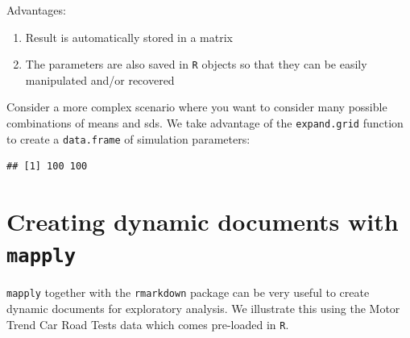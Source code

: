 \documentclass[]{book}
\makeatletter
\newenvironment{Shaded}{\begin{snugshade}}{\end{snugshade}}
\newcommand{\KeywordTok}[1]{\textcolor[rgb]{0.13,0.29,0.53}{\textbf{#1}}}
\newcommand{\DataTypeTok}[1]{\textcolor[rgb]{0.13,0.29,0.53}{#1}}
\newcommand{\DecValTok}[1]{\textcolor[rgb]{0.00,0.00,0.81}{#1}}
\newcommand{\StringTok}[1]{\textcolor[rgb]{0.31,0.60,0.02}{#1}}
\newcommand{\OperatorTok}[1]{\textcolor[rgb]{0.81,0.36,0.00}{\textbf{#1}}}
\newcommand{\NormalTok}[1]{#1}
\providecommand{\tightlist}{%
  \setlength{\itemsep}{0pt}\setlength{\parskip}{0pt}}
\providecommand{\tightlist}{%
  \setlength{\itemsep}{0pt}\setlength{\parskip}{0pt}}
\newenvironment{kframe}{%
\medskip{}
\setlength{\fboxsep}{.8em}
 \def\at@end@of@kframe{}%
 \ifinner\ifhmode%
  \def\at@end@of@kframe{\end{minipage}}%
  \begin{minipage}{\columnwidth}%
 \fi\fi%
 \def\FrameCommand##1{\hskip\@totalleftmargin \hskip-\fboxsep
 \colorbox{shadecolor}{##1}\hskip-\fboxsep
     \hskip-\linewidth \hskip-\@totalleftmargin \hskip\columnwidth}%
 \MakeFramed {\advance\hsize-\width
   \@totalleftmargin\z@ \linewidth\hsize
   \@setminipage}}%
 {\par\unskip\endMakeFramed%
 \at@end@of@kframe}
\renewenvironment{Shaded}{\begin{kframe}}{\end{kframe}}
\theoremstyle{definition}
\theoremstyle{definition}
\theoremstyle{definition}
\theoremstyle{remark}
\makeatother
\begin{document}
Advantages:

\begin{enumerate}
\def\labelenumi{\arabic{enumi}.}
\tightlist
\item
  Result is automatically stored in a matrix
\item
  The parameters are also saved in \texttt{R} objects so that they can
  be easily manipulated and/or recovered
\end{enumerate}

Consider a more complex scenario where you want to consider many
possible combinations of means and sds. We take advantage of the
\texttt{expand.grid} function to create a \texttt{data.frame} of
simulation parameters:

\begin{Shaded}
\end{Shaded}

\begin{verbatim}
## [1] 100 100
\end{verbatim}

\section{\texorpdfstring{Creating dynamic documents with
\texttt{mapply}}{Creating dynamic documents with mapply}}\label{creating-dynamic-documents-with-mapply}

\texttt{mapply} together with the \texttt{rmarkdown} package
\citep{R-rmarkdown} can be very useful to create dynamic documents for
exploratory analysis. We illustrate this using the Motor Trend Car Road
Tests data which comes pre-loaded in \texttt{R}.
\end{document}
